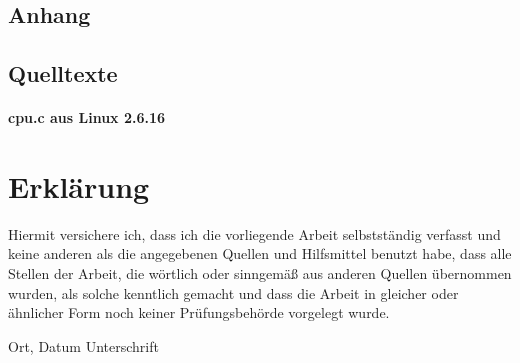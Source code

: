\begin{landscape}\begin{multicols}{2}
\appendix
\chapter{Anhang}
\section{Quelltexte}
\subsubsection*{cpu.c aus Linux 2.6.16}\label{s.cpu}
\end{multicols}\end{landscape}






\chapter*{Erklärung}

Hiermit versichere ich, dass ich die vorliegende Arbeit selbstständig verfasst und keine anderen als die angegebenen Quellen und Hilfsmittel benutzt habe, dass alle Stellen der Arbeit, die wörtlich oder sinngemäß aus anderen Quellen übernommen wurden, als solche kenntlich gemacht und dass die Arbeit in gleicher oder ähnlicher Form noch keiner Prüfungsbehörde vorgelegt wurde.

\vspace{3cm}
Ort, Datum \hspace{5cm} Unterschrift\\

